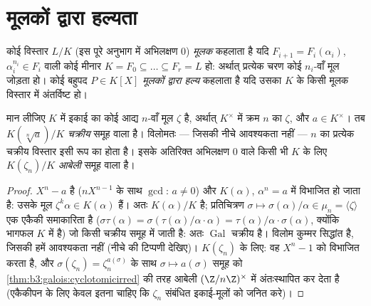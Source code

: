 \section{मूलकों द्वारा हल्यता}

\begin{definition}\label{def:b3:galois:radical}
कोई विस्तार $L/K$ (इस पूरे अनुभाग में अभिलक्षण $0$)
\emph{मूलक} कहलाता है यदि $F_{i+1} = F_i(\alpha_i)$, $\alpha_i^{n_i} \in F_i$ वाली कोई मीनार $K = F_0 \subseteq \dots
\subseteq F_r = L$ हो:
अर्थात् प्रत्येक चरण कोई $n_i$-वाँ मूल जोड़ता हो। कोई बहुपद
$P \in K[X]$ \emph{मूलकों द्वारा हल्य} कहलाता
है यदि उसका  $K$ के किसी मूलक विस्तार में
अंतर्विष्ट हो।
\end{definition}

\begin{lemma}\label{lem:b3:galois:cyclicsteps}
मान लीजिए $K$ में इकाई का कोई आद्य $n$-वाँ मूल $\zeta$ है,
अर्थात् $K^\times$ में क्रम $n$ का $\zeta$, और $a \in K^\times$। तब $K(\sqrt[n]a)/K$
\emph{चक्रीय} समूह वाला  है। विलोमतः --- जिसकी नीचे
आवश्यकता नहीं ---  $n$ का प्रत्येक चक्रीय विस्तार इसी रूप
का होता है। इसके अतिरिक्त अभिलक्षण $0$ वाले किसी भी $K$ के
लिए $K(\zeta_n)/K$ \emph{आबेली} समूह वाला  है।
\end{lemma}

\begin{proof}
$X^n - a$  है ($nX^{n-1}$ के साथ $\gcd$: $a \neq 0$) और $K(\alpha)$, $\alpha^n = a$ में
विभाजित हो जाता है: उसके मूल $\zeta^k\alpha \in K(\alpha)$ हैं। अतः $K(\alpha)/K$  है;
प्रतिचित्रण $\sigma \mapsto \sigma(\alpha)/\alpha \in \mu_n = \langle
\zeta\rangle$ एक एकैकी समाकारिता है ($\sigma\tau(\alpha) =
\sigma(\tau(\alpha)/\alpha \cdot \alpha) =
\tau(\alpha)/\alpha\cdot\sigma(\alpha)$, क्योंकि भागफल
$K$ में है) जो किसी चक्रीय समूह में जाती है: अतः $\operatorname{Gal}$ चक्रीय
है। विलोम कुम्मर सिद्धांत है, जिसकी हमें आवश्यकता नहीं (नीचे की
टिप्पणी देखिए)। $K(\zeta_n)$ के लिए: वह  $X^n -
1$ को विभाजित करता
है, और $\sigma(\zeta_n) =
\zeta_n^{a(\sigma)}$ के साथ $\sigma \mapsto a(\sigma)$ समूह को \cref{thm:b3:galois:cyclotomicirred} की तरह आबेली $(\Z/n\Z)^\times$ में
अंतःस्थापित कर देता है (एकैकीपन के लिए केवल इतना चाहिए कि $\zeta_n$
संबंधित इकाई-मूलों को जनित करे)।
\end{proof}

